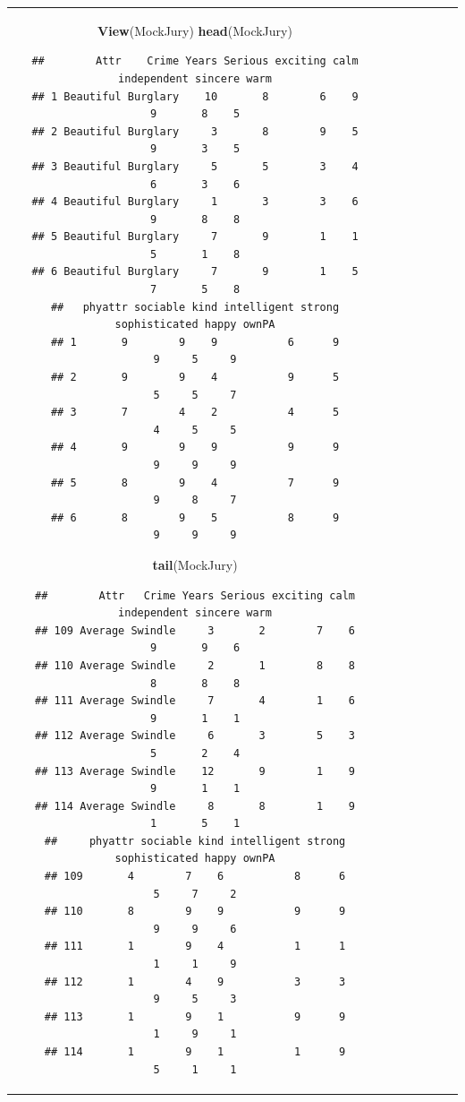\documentclass[]{book}
\newenvironment{Shaded}{\begin{snugshade}}{\end{snugshade}}
\newcommand{\KeywordTok}[1]{\textcolor[rgb]{0.13,0.29,0.53}{\textbf{#1}}}
\newcommand{\NormalTok}[1]{#1}
\theoremstyle{definition}
\theoremstyle{definition}
\theoremstyle{remark}
\begin{document}
\begin{longtable}[]{@{}ccccccc@{}}
\begin{minipage}[b]{0.10\columnwidth}
\begin{Shaded}
\begin{Highlighting}[]
\KeywordTok{View}\NormalTok{(MockJury)}
\KeywordTok{head}\NormalTok{(MockJury)}
\end{Highlighting}
\end{Shaded}

\begin{verbatim}
##        Attr    Crime Years Serious exciting calm independent sincere warm
## 1 Beautiful Burglary    10       8        6    9           9       8    5
## 2 Beautiful Burglary     3       8        9    5           9       3    5
## 3 Beautiful Burglary     5       5        3    4           6       3    6
## 4 Beautiful Burglary     1       3        3    6           9       8    8
## 5 Beautiful Burglary     7       9        1    1           5       1    8
## 6 Beautiful Burglary     7       9        1    5           7       5    8
##   phyattr sociable kind intelligent strong sophisticated happy ownPA
## 1       9        9    9           6      9             9     5     9
## 2       9        9    4           9      5             5     5     7
## 3       7        4    2           4      5             4     5     5
## 4       9        9    9           9      9             9     9     9
## 5       8        9    4           7      9             9     8     7
## 6       8        9    5           8      9             9     9     9
\end{verbatim}

\begin{Shaded}
\begin{Highlighting}[]
\KeywordTok{tail}\NormalTok{(MockJury)}
\end{Highlighting}
\end{Shaded}

\begin{verbatim}
##        Attr   Crime Years Serious exciting calm independent sincere warm
## 109 Average Swindle     3       2        7    6           9       9    6
## 110 Average Swindle     2       1        8    8           8       8    8
## 111 Average Swindle     7       4        1    6           9       1    1
## 112 Average Swindle     6       3        5    3           5       2    4
## 113 Average Swindle    12       9        1    9           9       1    1
## 114 Average Swindle     8       8        1    9           1       5    1
##     phyattr sociable kind intelligent strong sophisticated happy ownPA
## 109       4        7    6           8      6             5     7     2
## 110       8        9    9           9      9             9     9     6
## 111       1        9    4           1      1             1     1     9
## 112       1        4    9           3      3             9     5     3
## 113       1        9    1           9      9             1     9     1
## 114       1        9    1           1      9             5     1     1
\end{verbatim}


\end{minipage}
\end{longtable}
\end{document}
